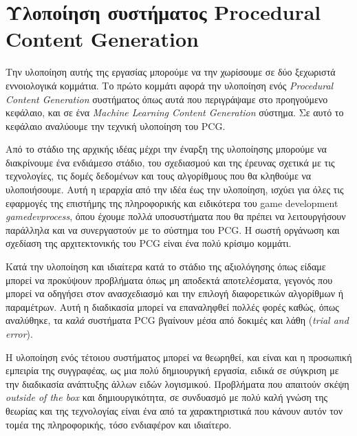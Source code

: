 \thispagestyle{empty}

\chapter{Υλοποίηση συστήματος Procedural Content Generation}

Την υλοποίηση αυτής της εργασίας μπορούμε να την χωρίσουμε σε δύο ξεχωριστά εννοιολογικά κομμάτια. Το πρώτο κομμάτι αφορά την υλοποίηση ενός \textit{Procedural Content Generation} συστήματος όπως αυτά που περιγράψαμε στο προηγούμενο κεφάλαιο, και σε ένα \textit{Machine Learning Content Generation} σύστημα. Σε αυτό το κεφάλαιο αναλύουμε την τεχνική υλοποίηση του PCG.
\par
Από το στάδιο της αρχικής ιδέας μέχρι την έναρξη της υλοποίησης μπορούμε να διακρίνουμε ένα ενδιάμεσο στάδιο, του σχεδιασμού και της έρευνας σχετικά με τις τεχνολογίες, τις δομές δεδομένων και τους αλγορίθμους που θα κληθούμε να υλοποιήσουμε. Αυτή η ιεραρχία από την ιδέα έως την υλοποίηση, ισχύει για όλες τις εφαρμογές της επιστήμης της πληροφορικής και ειδικότερα του game development \textit{gamedevprocess}, όπου έχουμε πολλά υποσυστήματα που θα πρέπει να λειτουργήσουν παράλληλα και να συνεργαστούν με το σύστημα του PCG. Η σωστή οργάνωση και σχεδίαση της αρχιτεκτονικής του PCG είναι ένα πολύ κρίσιμο κομμάτι.
\par
Κατά την υλοποίηση και ιδιαίτερα κατά το στάδιο της αξιολόγησης όπως είδαμε μπορεί να προκύψουν προβλήματα όπως μη αποδεκτά αποτελέσματα, γεγονός που μπορεί να οδηγήσει στον ανασχεδιασμό και την επιλογή διαφορετικών αλγορίθμων ή παραμέτρων. Αυτή η διαδικασία μπορεί να επαναληφθεί πολλές φορές καθώς, όπως αναλύθηκε, τα \textit{καλά} συστήματα PCG βγαίνουν μέσα από δοκιμές και λάθη (\textit{trial and error}).
\par
Η υλοποίηση ενός τέτοιου συστήματος μπορεί να θεωρηθεί, και είναι και η προσωπική εμπειρία της συγγραφέας, ως μια πολύ δημιουργική εργασία, ειδικά σε σύγκριση με την διαδικασία ανάπτυξης άλλων ειδών λογισμικού. Προβλήματα που απαιτούν σκέψη \textit{outside of the box} και δημιουργικότητα, σε συνδυασμό με πολύ καλή γνώση της θεωρίας και της τεχνολογίας είναι ένα από τα χαρακτηριστικά που κάνουν αυτόν τον τομέα της πληροφορικής, τόσο ενδιαφέρον και ιδιαίτερο.

